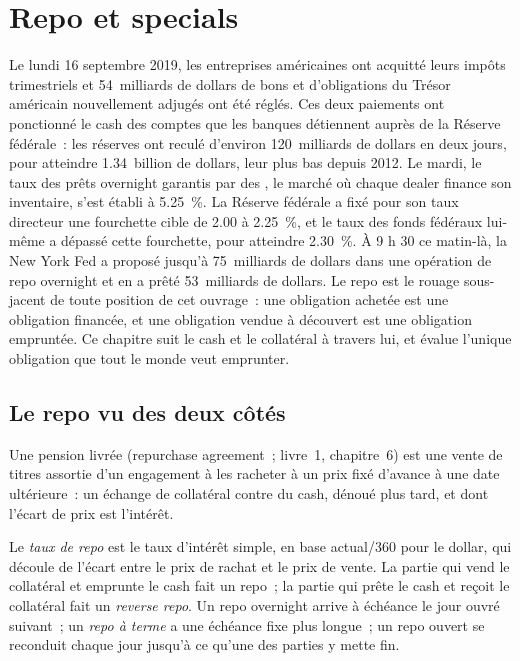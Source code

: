 \chapter{Repo et specials}\label{ch:m2:repo-and-specials}

Le lundi 16 septembre 2019, les entreprises américaines ont acquitté leurs impôts trimestriels
et 54~milliards de dollars de bons et d'obligations du Trésor américain nouvellement adjugés ont été réglés.
Ces deux paiements ont ponctionné le cash des comptes que les banques détiennent auprès de la Réserve fédérale~: les réserves ont reculé
d'environ 120~milliards de dollars en deux jours, pour atteindre 1.34~billion de dollars, leur plus bas depuis
2012. Le mardi, le taux des prêts overnight garantis par des , le marché
où chaque dealer finance son inventaire, s'est établi à 5.25~\%. La Réserve
fédérale a fixé pour son taux directeur une fourchette cible de 2.00 à 2.25~\%, et le
taux des fonds fédéraux lui-même a dépassé cette fourchette, pour atteindre 2.30~\%. À 9 h 30 ce matin-là, la New York Fed
a proposé jusqu'à 75~milliards de dollars dans une opération de repo overnight et en a prêté
53~milliards de dollars. Le repo est
le rouage sous-jacent de toute position de cet ouvrage~: une obligation achetée est une
obligation financée, et une obligation vendue à découvert est une obligation empruntée. Ce chapitre suit le cash
et le collatéral à travers lui, et évalue l'unique obligation que tout le monde veut
emprunter.

\section{Le repo vu des deux côtés}

Une pension livrée (repurchase agreement~; livre~1, chapitre~6) est une vente de titres
assortie d'un engagement à les racheter à un prix fixé d'avance à une date ultérieure~: un
échange de collatéral contre du cash, dénoué plus tard, et dont l'écart de prix est
l'intérêt.

\begin{definition}\label{def:m2:repo-and-specials:rate}
Le \emph{taux de repo} est le taux d'intérêt simple, en base actual/360
pour le dollar, qui découle de l'écart entre le prix de rachat et le prix de
vente. La partie qui vend le collatéral et emprunte le cash fait un repo~; la
partie qui prête le cash et reçoit le collatéral fait un \emph{reverse
repo}. Un repo overnight arrive à échéance le jour ouvré suivant~;
un \emph{repo à terme} a une échéance fixe plus longue~; un repo ouvert
se reconduit chaque jour jusqu'à ce qu'une des parties y mette fin.
\end{definition}

